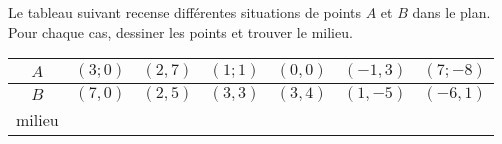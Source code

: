 
\begin{exercice}\label{exosmath-0021}

\begin{example}
    Le tableau suivant recense différentes situations de points \( A\) et \( B\) dans le plan. Pour chaque cas, dessiner les points et trouver le milieu.

    \begin{center}
        \begin{tabular}[h]{|c||c|c|c|c|c|c|}
            \hline
            \( A\)&\( (3;0)\)&\( (2,7)\)&\( (1;1)\)&\( (0,0)\)&\( (-1,3)\)&\( (7;-8)\)\\
            \hline
            \( B\)&\( (7,0)\)&\( (2,5)\)&\( (3,3)\)&\( (3,4)\)&\( (1,-5)\)&\( (-6,1)\)\\
            \hline\hline
            milieu&&&&&&\\
            \hline
        \end{tabular}
    \end{center}
\end{example}

\end{exercice}
